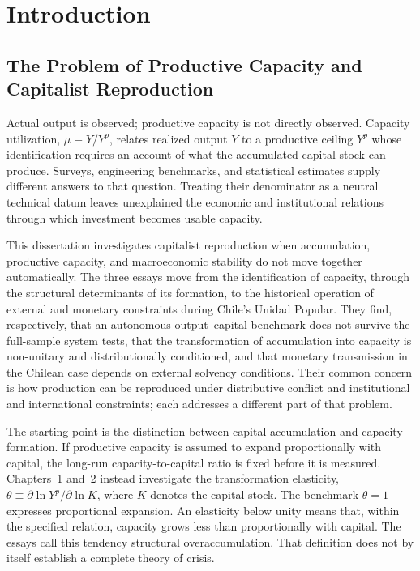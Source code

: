 \chapter*{Introduction}

\section*{The Problem of Productive Capacity and Capitalist Reproduction}

Actual output is observed; productive capacity is not directly observed. Capacity utilization, $\mu \equiv Y/Y^p$, relates realized output $Y$ to a productive ceiling $Y^p$ whose identification requires an account of what the accumulated capital stock can produce. Surveys, engineering benchmarks, and statistical estimates supply different answers to that question. Treating their denominator as a neutral technical datum leaves unexplained the economic and institutional relations through which investment becomes usable capacity.

This dissertation investigates capitalist reproduction when accumulation, productive capacity, and macroeconomic stability do not move together automatically. The three essays move from the identification of capacity, through the structural determinants of its formation, to the historical operation of external and monetary constraints during Chile's Unidad Popular. They find, respectively, that an autonomous output--capital benchmark does not survive the full-sample system tests, that the transformation of accumulation into capacity is non-unitary and distributionally conditioned, and that monetary transmission in the Chilean case depends on external solvency conditions. Their common concern is how production can be reproduced under distributive conflict and institutional and international constraints; each addresses a different part of that problem.

The starting point is the distinction between capital accumulation and capacity formation. If productive capacity is assumed to expand proportionally with capital, the long-run capacity-to-capital ratio is fixed before it is measured. Chapters~1 and~2 instead investigate the transformation elasticity, $\theta \equiv \partial\ln Y^p/\partial\ln K$, where $K$ denotes the capital stock. The benchmark $\theta=1$ expresses proportional expansion. An elasticity below unity means that, within the specified relation, capacity grows less than proportionally with capital. The essays call this tendency structural overaccumulation. That definition does not by itself establish a complete theory of crisis.


